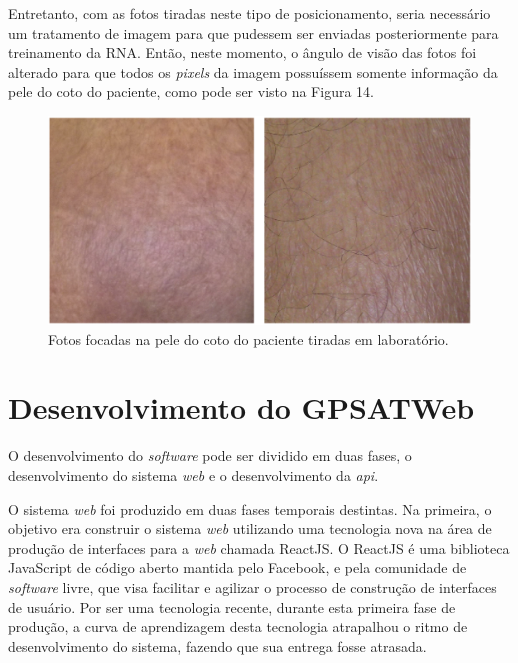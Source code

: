 	Entretanto, com as fotos tiradas neste tipo de posicionamento, seria necessário um tratamento de imagem para que pudessem ser enviadas posteriormente para treinamento da RNA. Então, neste momento, o ângulo de visão das fotos foi alterado para que todos os \textit{pixels} da imagem possuíssem somente informação da pele do coto do paciente, como pode ser visto na Figura 14.

	\begin{figure}[ht]
	    \centering
	    \label{fig14}
	        \includegraphics[keepaspectratio=true, scale=0.6]{editaveis/images/figura_coto_corte.eps}
	    \caption{Fotos focadas na pele do coto do paciente tiradas em laboratório.}
	\end{figure} 


\section{Desenvolvimento do GPSATWeb}
	O desenvolvimento do \textit{software} pode ser dividido em duas fases, o desenvolvimento do sistema \textit{web} e o desenvolvimento da \textit{api}. 

	O sistema \textit{web} foi produzido em duas fases temporais destintas. Na primeira, o objetivo era construir o sistema \textit{web} utilizando uma tecnologia nova na área de produção de interfaces para a \textit{web} chamada ReactJS. O ReactJS é uma biblioteca JavaScript de código aberto mantida pelo Facebook, e pela comunidade de \textit{software} livre, que visa facilitar e agilizar o processo de construção de interfaces de usuário. Por ser uma tecnologia recente, durante esta primeira fase de produção, a curva de aprendizagem desta tecnologia atrapalhou o ritmo de desenvolvimento do sistema, fazendo que sua entrega fosse atrasada.

